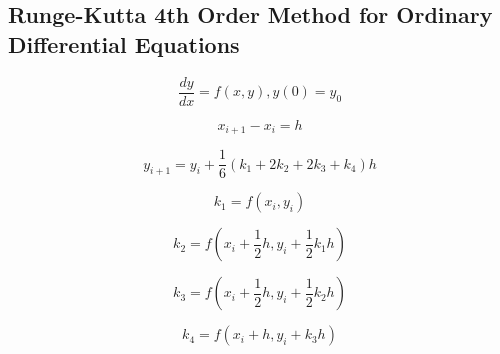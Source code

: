 \subsection{Runge-Kutta 4th Order Method for Ordinary Differential Equations}

\[\frac{dy}{dx} = f(x, y), y(0) = y_0\]

\[x_{i + 1} - x_i = h\]

\[y_{i + 1} = y_i + \frac{1}{6}(k_1 + 2 k_2 + 2 k_3 + k_4) h\]

\[k_1 = f(x_i, y_i)\]

\[k_2 = f(x_i + \frac{1}{2} h, y_i + \frac{1}{2} k_1 h)\]

\[k_3 = f(x_i + \frac{1}{2} h, y_i + \frac{1}{2} k_2 h)\]

\[k_4 = f(x_i + h, y_i + k_3 h)\]
